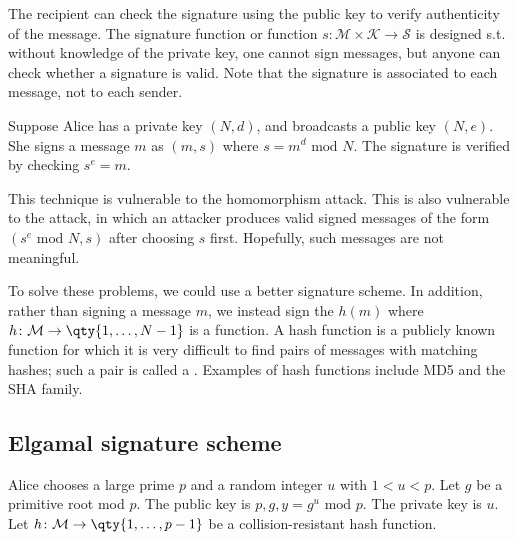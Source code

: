 The recipient can check the signature using the public key to verify authenticity of the message.
The signature function or  function $s \colon \mathcal M \times \mathcal K \to \mathcal S$ is designed s.t. without knowledge of the private key, one cannot sign messages, but anyone can check whether a signature is valid.
Note that the signature is associated to each message, not to each sender.
\begin{example}
    Suppose Alice has a private key $(N, d)$, and broadcasts a public key $(N, e)$.
    She signs a message $m$ as $(m, s)$ where $s = m^d \text{ mod } N$.
    The signature is verified by checking $s^e = m$.

    This technique is vulnerable to the homomorphism attack.
    This is also vulnerable to the  attack, in which an attacker produces valid signed messages of the form $(s^e \text{ mod } N, s)$ after choosing $s$ first.
    Hopefully, such messages are not meaningful.

    To solve these problems, we could use a better signature scheme.
    In addition, rather than signing a message $m$, we instead sign the  $h(m)$ where $h \colon \mathcal M \to \qty{1, \dots, N-1}$ is a  function.
    A hash function is a publicly known function for which it is very difficult to find pairs of messages with matching hashes; such a pair is called a .
    Examples of hash functions include MD5 and the SHA family.
\end{example}

\subsection{Elgamal signature scheme}
Alice chooses a large prime $p$ and a random integer $u$ with $1 < u < p$.
Let $g$ be a primitive root mod $p$.
The public key is $p, g, y = g^u \text{ mod } p$.
The private key is $u$.
Let $h \colon \mathcal M \to \qty{1, \dots, p-1}$ be a collision-resistant hash function.

